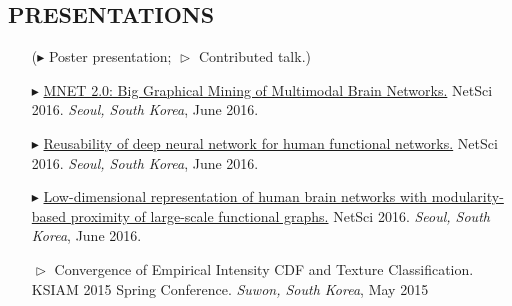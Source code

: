 \documentclass[margin, 10pt]{res} %
\begin{document}
\begin{resume}
%
%
%


\section{\sf PRESENTATIONS}

\begin{itemize}
	\item[]($\blacktriangleright$ Poster presentation; $\vartriangleright$ Contributed talk.)
	\item[$\blacktriangleright$] 
	\href{http://kyoustat.com/presentation/2016_NetSci_MNET.pdf}{MNET 2.0: Big Graphical Mining of Multimodal Brain Networks.} NetSci 2016. \emph{Seoul, South Korea}, June 2016.
	\item[$\blacktriangleright$]
	\href{http://kyoustat.com/presentation/2016_NetSci_DeepLearning.pdf}{Reusability of deep neural network for human functional networks.} NetSci 2016. \emph{Seoul, South Korea}, June 2016.
	\item[$\blacktriangleright$] 
	\href{http://kyoustat.com/presentation/2016_NetSci_LAMP.pdf}{Low-dimensional representation of human brain networks with modularity-based proximity of large-scale functional graphs.} NetSci 2016. \emph{Seoul, South Korea}, June 2016.
	\item[$\vartriangleright$]
	Convergence of Empirical Intensity CDF and Texture Classification. KSIAM 2015 Spring Conference. \emph{Suwon, South Korea}, May 2015
\end{itemize}


\end{resume}
\end{document}
